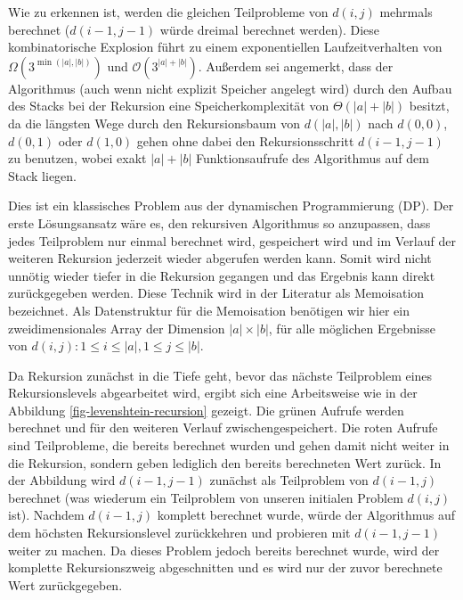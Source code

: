 \documentclass{whswinvcbook}
\begin{document}
Wie zu erkennen ist, werden die gleichen Teilprobleme von $d(i,j)$ mehrmals berechnet ($d(i-1,j-1)$ würde dreimal berechnet werden). Diese kombinatorische Explosion führt zu einem exponentiellen Laufzeitverhalten von $\Omega(3^{\min(|a|,|b|)})$ und $\mathcal{O}(3^{|a|+|b|})$. Außerdem sei angemerkt, dass der Algorithmus (auch wenn nicht explizit Speicher angelegt wird) durch den Aufbau des Stacks bei der Rekursion eine Speicherkomplexität von $\Theta(|a|+|b|)$ besitzt, da die längsten Wege durch den Rekursionsbaum von $d(|a|,|b|)$ nach $d(0,0)$, $d(0,1)$ oder $d(1,0)$ gehen ohne dabei den Rekursionsschritt $d(i-1,j-1)$ zu benutzen, wobei exakt $|a|+|b|$ Funktionsaufrufe des Algorithmus auf dem Stack liegen.

Dies ist ein klassisches Problem aus der dynamischen Programmierung (DP). Der erste Lösungsansatz wäre es, den rekursiven Algorithmus so anzupassen, dass jedes Teilproblem nur einmal berechnet wird, gespeichert wird und im Verlauf der weiteren Rekursion jederzeit wieder abgerufen werden kann. Somit wird nicht unnötig wieder tiefer in die Rekursion gegangen und das Ergebnis kann direkt zurückgegeben werden. Diese Technik wird in der Literatur als Memoisation bezeichnet. Als Datenstruktur für die Memoisation benötigen wir hier ein zweidimensionales Array der Dimension $|a|\times |b|$, für alle möglichen Ergebnisse von $d(i,j):1\leq i\leq|a|,1\leq j\leq|b|$.

Da Rekursion zunächst in die Tiefe geht, bevor das nächste Teilproblem eines Rekursionslevels abgearbeitet wird, ergibt sich eine Arbeitsweise wie in der Abbildung \ref{fig-levenshtein-recursion} gezeigt. Die grünen Aufrufe werden berechnet und für den weiteren Verlauf zwischengespeichert. Die roten Aufrufe sind Teilprobleme, die bereits berechnet wurden und gehen damit nicht weiter in die Rekursion, sondern geben lediglich den bereits berechneten Wert zurück. In der Abbildung wird $d(i-1,j-1)$ zunächst als Teilproblem von $d(i-1,j)$ berechnet (was wiederum ein Teilproblem von unseren initialen Problem $d(i,j)$ ist). Nachdem $d(i-1,j)$ komplett berechnet wurde, würde der Algorithmus auf dem höchsten Rekursionslevel zurückkehren und probieren mit $d(i-1,j-1)$ weiter zu machen. Da dieses Problem jedoch bereits berechnet wurde, wird der komplette Rekursionszweig abgeschnitten und es wird nur der zuvor berechnete Wert zurückgegeben.
\end{document}
